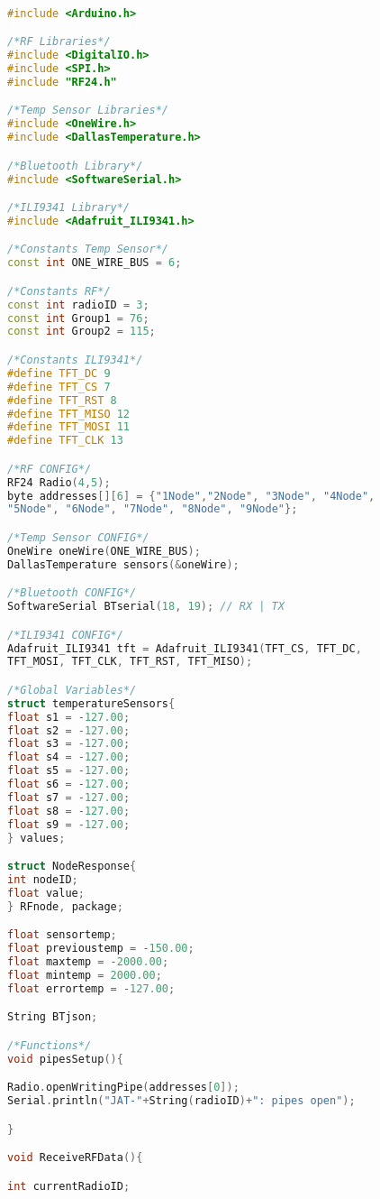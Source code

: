 \begin{lstlisting}[language=C++, caption={Firmware de nuestro prototipo en su versión 1.0}, captionpos=b, basicstyle=\small]

#include <Arduino.h>

/*RF Libraries*/
#include <DigitalIO.h>
#include <SPI.h>
#include "RF24.h"

/*Temp Sensor Libraries*/
#include <OneWire.h>
#include <DallasTemperature.h>

/*Bluetooth Library*/
#include <SoftwareSerial.h>

/*ILI9341 Library*/
#include <Adafruit_ILI9341.h>

/*Constants Temp Sensor*/
const int ONE_WIRE_BUS = 6;

/*Constants RF*/
const int radioID = 3;
const int Group1 = 76;
const int Group2 = 115;

/*Constants ILI9341*/
#define TFT_DC 9
#define TFT_CS 7
#define TFT_RST 8
#define TFT_MISO 12
#define TFT_MOSI 11
#define TFT_CLK 13

/*RF CONFIG*/
RF24 Radio(4,5);
byte addresses[][6] = {"1Node","2Node", "3Node", "4Node", 
"5Node", "6Node", "7Node", "8Node", "9Node"};

/*Temp Sensor CONFIG*/
OneWire oneWire(ONE_WIRE_BUS);
DallasTemperature sensors(&oneWire);

/*Bluetooth CONFIG*/
SoftwareSerial BTserial(18, 19); // RX | TX

/*ILI9341 CONFIG*/
Adafruit_ILI9341 tft = Adafruit_ILI9341(TFT_CS, TFT_DC, 
TFT_MOSI, TFT_CLK, TFT_RST, TFT_MISO);

/*Global Variables*/
struct temperatureSensors{
float s1 = -127.00;
float s2 = -127.00;
float s3 = -127.00;
float s4 = -127.00;
float s5 = -127.00;
float s6 = -127.00;
float s7 = -127.00;
float s8 = -127.00;
float s9 = -127.00;
} values;

struct NodeResponse{
int nodeID;
float value;
} RFnode, package;

float sensortemp;
float previoustemp = -150.00;
float maxtemp = -2000.00;
float mintemp = 2000.00;
float errortemp = -127.00;

String BTjson;

/*Functions*/
void pipesSetup(){

Radio.openWritingPipe(addresses[0]);
Serial.println("JAT-"+String(radioID)+": pipes open");

}

void ReceiveRFData(){

int currentRadioID;


\end{lstlisting}
